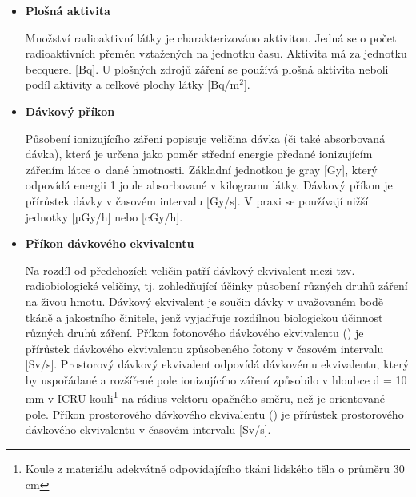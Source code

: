 \begin{itemize}
\item \textbf{Plošná aktivita}
	
  Množství radioaktivní látky je charakterizováno aktivitou. Jedná se
  o počet radioaktivních přeměn vztažených na jednotku času. Aktivita
  má za jednotku becquerel {[}Bq{]}. U plošných zdrojů záření se
  používá plošná aktivita neboli podíl aktivity a celkové plochy látky
  {[}Bq/m$^2${]}.
	
\item \textbf{Dávkový příkon}
	
  Působení ionizujícího záření popisuje veličina dávka (či také
  absorbovaná dávka), která je určena jako poměr střední energie
  předané ionizujícím zářením látce o~dané hmotnosti. Základní
  jednotkou je gray {[}Gy{]}, který odpovídá energii 1 joule
  absorbované v kilogramu látky. Dávkový příkon je přírůstek dávky v
  časovém intervalu {[}Gy/s{]}. V praxi se používají nižší jednotky
  {[}µGy/h{]} nebo {[}cGy/h{]}.

\item \textbf{Příkon dávkového ekvivalentu}
	
  Na rozdíl od předchozích veličin patří dávkový ekvivalent mezi
  tzv. radiobiologické veličiny, tj. zohledňující účinky působení
  různých druhů záření na živou hmotu. Dávkový ekvivalent je součin
  dávky v uvažovaném bodě tkáně a jakostního činitele, jenž vyjadřuje
  rozdílnou biologickou účinnost různých druhů záření. Příkon
  fotonového dávkového ekvivalentu () je přírůstek dávkového
  ekvivalentu způsobeného fotony v časovém intervalu
  {[}Sv/s{]}. Prostorový dávkový ekvivalent odpovídá dávkovému
  ekvivalentu, který by uspořádané a rozšířené pole ionizujícího
  záření způsobilo v hloubce d = 10 mm v ICRU kouli\footnote{Koule z
    materiálu adekvátně odpovídajícího tkáni lidského těla o průměru
    30 cm} na rádius vektoru opačného směru, než je orientované
  pole. Příkon prostorového dávkového ekvivalentu () je
  přírůstek prostorového dávkového ekvivalentu v časovém intervalu
  {[}Sv/s{]}.



\end{itemize}
